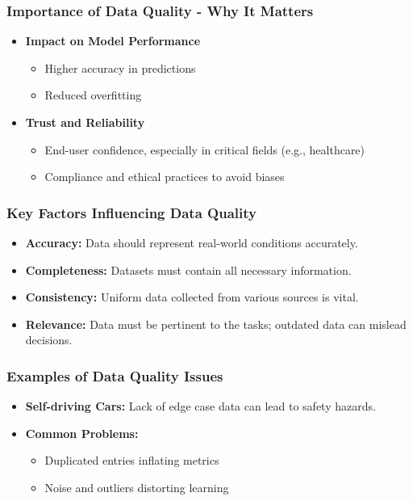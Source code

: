 \documentclass[aspectratio=169]{beamer}
\begin{document}
\begin{frame}[fragile]
    \frametitle{Importance of Data Quality - Why It Matters}
    \begin{itemize}
        \item \textbf{Impact on Model Performance}
            \begin{itemize}
                \item Higher accuracy in predictions 
                \item Reduced overfitting
            \end{itemize}
        \item \textbf{Trust and Reliability}
            \begin{itemize}
                \item End-user confidence, especially in critical fields (e.g., healthcare)
                \item Compliance and ethical practices to avoid biases
            \end{itemize}
    \end{itemize}
\end{frame}

\begin{frame}[fragile]
    \frametitle{Key Factors Influencing Data Quality}
    \begin{itemize}
        \item \textbf{Accuracy:} Data should represent real-world conditions accurately.
        \item \textbf{Completeness:} Datasets must contain all necessary information.
        \item \textbf{Consistency:} Uniform data collected from various sources is vital.
        \item \textbf{Relevance:} Data must be pertinent to the tasks; outdated data can mislead decisions.
    \end{itemize}
\end{frame}

\begin{frame}[fragile]
    \frametitle{Examples of Data Quality Issues}
    \begin{itemize}
        \item \textbf{Self-driving Cars:} 
              Lack of edge case data can lead to safety hazards.
        \item \textbf{Common Problems:}
            \begin{itemize}
                \item Duplicated entries inflating metrics
                \item Noise and outliers distorting learning
            \end{itemize}
    \end{itemize}
\end{frame}
\end{document}
